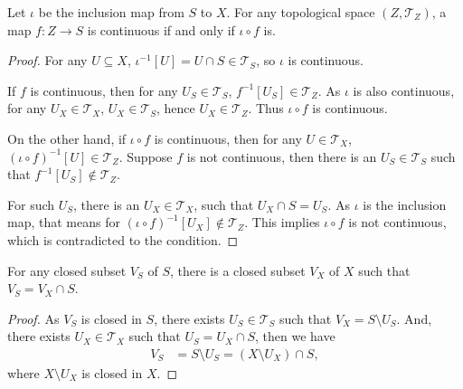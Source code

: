 \begin{proposition}
	Let $\iota$ be the inclusion map from $S$ to $X$. For any topological space $(Z, \mathcal T_Z)$, a map $f: Z \to S$ is continuous if and only if $\iota \circ f$ is.
	
	\begin{proof}			
		For any $U \subseteq X$, $\iota^{-1}[U] = U \cap S \in \mathcal T_S$, so $\iota$ is continuous.
		
		If $f$ is continuous, then for any $U_S \in \mathcal T_S$, $f^{-1}[U_S] \in \mathcal T_Z$. As $\iota$ is also continuous, for any $U_X \in \mathcal T_X$, $U_X \in \mathcal T_S$, hence $U_X \in \mathcal T_Z$. Thus $\iota \circ f$ is continuous.
		
		On the other hand, if $\iota \circ f$ is continuous, then for any $U \in \mathcal T_X$, $(\iota \circ f)^{-1}[U] \in \mathcal T_Z$. Suppose $f$ is not continuous, then there is an $U_S \in \mathcal T_S$ such that $f^{-1}[U_S] \notin \mathcal T_Z$.
		
		For such $U_S$, there is an $U_X \in \mathcal T_X$, such that $U_X \cap S = U_S$. As $\iota$ is the inclusion map, that means for $(\iota \circ f)^{-1}[U_X] \notin \mathcal T_Z$. This implies $\iota \circ f$ is not continuous, which is contradicted to the condition.
	\end{proof}
\end{proposition}


\begin{proposition}
	For any closed subset $V_S$ of $S$, there is a closed subset $V_X$ of $X$ such that $V_S = V_X \cap S$.
	
	\begin{proof}
		As $V_S$ is closed in $S$, there exists $U_S \in \mathcal T_S$ such that $V_X = S \setminus U_S$. And, there exists $U_X \in \mathcal T_X$ such that $U_S = U_X \cap S$, then we have
		$$
		\begin{aligned}
			V_S &= S \setminus U_S = (X \setminus U_X) \cap S,
		\end{aligned}
		$$
		where $X \setminus U_X$ is closed in $X$.
	\end{proof}
\end{proposition}


